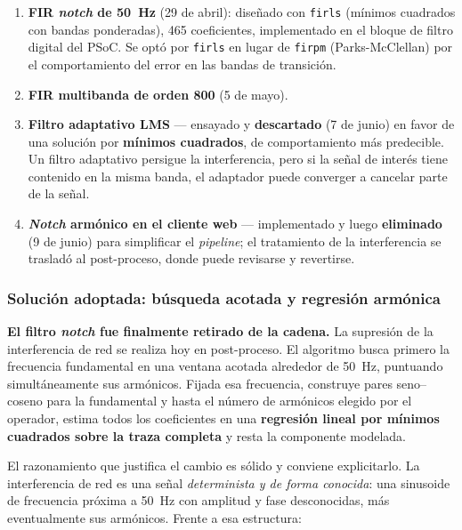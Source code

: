 \begin{enumerate}[itemsep=0.2em]
    \item \textbf{FIR \emph{notch} de \SI{50}{\hertz}} (29 de abril): dise\~nado con
    \texttt{firls} (m\'inimos cuadrados con bandas ponderadas), 465 coeficientes,
    implementado en el bloque de filtro digital del PSoC. Se opt\'o por \texttt{firls}
    en lugar de \texttt{firpm} (Parks-McClellan) por el comportamiento del error en las
    bandas de transici\'on.
    \item \textbf{FIR multibanda de orden 800} (5 de mayo).
    \item \textbf{Filtro adaptativo LMS} --- ensayado y \textbf{descartado} (7 de junio) en
    favor de una soluci\'on por \textbf{m\'inimos cuadrados}, de comportamiento m\'as
    predecible. Un filtro adaptativo persigue la interferencia, pero si la se\~nal de
    inter\'es tiene contenido en la misma banda, el adaptador puede converger a cancelar
    parte de la se\~nal.
    \item \textbf{\emph{Notch} arm\'onico en el cliente web} --- implementado y luego
    \textbf{eliminado} (9 de junio) para simplificar el \emph{pipeline}; el tratamiento
    de la interferencia se traslad\'o al post-proceso, donde puede revisarse y revertirse.
\end{enumerate}

\subsubsection{Soluci\'on adoptada: b\'usqueda acotada y regresi\'on arm\'onica}

\textbf{El filtro \emph{notch} fue finalmente retirado de la cadena.} La supresi\'on de la
interferencia de red se realiza hoy en post-proceso. El algoritmo busca primero la
frecuencia fundamental en una ventana acotada alrededor de \SI{50}{\hertz}, puntuando
simult\'aneamente sus arm\'onicos. Fijada esa frecuencia, construye pares seno--coseno para
la fundamental y hasta el n\'umero de arm\'onicos elegido por el operador, estima todos los
coeficientes en una \textbf{regresi\'on lineal por m\'inimos cuadrados sobre la traza
completa} y resta la componente modelada.

El razonamiento que justifica el cambio es s\'olido y conviene explicitarlo. La
interferencia de red es una se\~nal \emph{determinista y de forma conocida}: una sinusoide
de frecuencia pr\'oxima a \SI{50}{\hertz} con amplitud y fase desconocidas, m\'as
eventualmente sus arm\'onicos. Frente a esa estructura:

